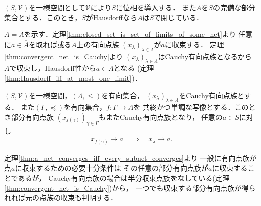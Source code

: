 	\begin{screen}
		\begin{thm}[Hausdorff一様位相空間の完備部分集合は閉]
			$(S,\mathscr{V})$を一様空間として$\mathscr{V}$により$S$に位相を導入する．
			また$A$を$S$の完備な部分集合とする．このとき，$S$がHausdorffなら$A$は$S$で閉じている．
		\end{thm}
	\end{screen}
	
	\begin{prf}
		$A = \overline{A}$を示す．定理\ref{thm:closed_set_is_set_of_limits_of_some_net}より
		任意に$a \in \overline{A}$を取れば或る$A$上の有向点族
		$(x_\lambda)_{\lambda \in \Lambda}$が$a$に収束する．
		定理\ref{thm:convergent_net_is_Cauchy}より
		$(x_\lambda)_{\lambda \in \Lambda}$はCauchy有向点族となるから
		$A$で収束し，Hausdorff性から$a \in A$となる
		(定理\ref{thm:Hausdorff_iff_at_most_one_limit})．
		\QED
	\end{prf}
	
	\begin{screen}
		\begin{thm}[完備な一様空間の閉集合は完備]
		\end{thm}
	\end{screen}
	
	\begin{screen}
		\begin{thm}
		\label{thm:subnet_of_a_Cauchy_net_is_Cauchy}
			$(S,\mathscr{V})$を一様空間，$(\Lambda,\leq)$を有向集合，
			$(x_\lambda)_{\lambda \in \Lambda}$をCauchy有向点族とする．
			また$(\Gamma,\preceq)$を有向集合，$f:\Gamma \longrightarrow \Lambda$を
			共終かつ単調な写像とする．このとき部分有向点族
			$(x_{f(\gamma)})_{\gamma \in \Gamma}$もまたCauchy有向点族となり，
			任意の$a \in S$に対し
			\begin{align}
				x_{f(\gamma)} \longrightarrow a
				\quad \Longrightarrow \quad
				x_\lambda \longrightarrow a.
			\end{align}
		\end{thm}
	\end{screen}
	定理\ref{thm:a_net_converges_iff_every_subnet_converges}より
	一般に有向点族が点$a$に収束するための必要十分条件は
	その任意の部分有向点族が$a$に収束することであるが，
	Cauchy有向点族の場合は半分収束点族をなしている(定理\ref{thm:convergent_net_is_Cauchy})から，
	一つでも収束する部分有向点族が得られれば元の点族の収束も判明する．
	
